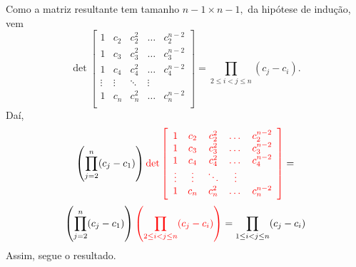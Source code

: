 \documentclass[11pt,a4paper]{article}
\begin{document}
{\[\]
Como a matriz resultante tem tamanho $n-1 \times n-1,$ da hipótese de indução, vem
\[
 \det \left[\begin{array}{ccccc}   1& c_2 & c_2^2 & \dots & c_2^{n-2}\\  1 & c_3 & c_3^2 & \dots & c_3^{n-2} \\  1 & c_4 & c_4^2 & \dots & c_4^{n-2}\\  \vdots & \vdots & \ddots &\vdots \\ 1 & c_n & c_n^2 & \dots & c_n^{n-2}\\ \end{array}\right] =  \prod\limits_{2 \le i < j \le n} (c_j - c_i).
\]
Daí,
\[
\left(\prod\limits_{j = 2}^n (c_j - c_1) \right) \textcolor{red}{\det \left[\begin{array}{ccccc}   1& c_2 & c_2^2 & \dots & c_2^{n-2}\\  1 & c_3 & c_3^2 & \dots & c_3^{n-2} \\  1 & c_4 & c_4^2 & \dots & c_4^{n-2}\\  \vdots & \vdots & \ddots &\vdots \\ 1 & c_n & c_n^2 & \dots & c_n^{n-2}\\ \end{array}\right]} = \]\[\left(\prod\limits_{j = 2}^n (c_j - c_1) \right) \textcolor{red}{\left(\prod\limits_{2 \le i < j \le n} (c_j - c_i) \right)} = \prod\limits_{1 \le i < j \le n} (c_j - c_i) 
\]
Assim, segue o resultado.
}
\end{document}
